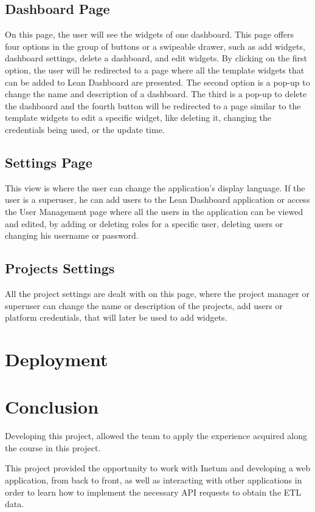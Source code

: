 \documentclass[a4paper,twoside,10pt]{report}
\begin{document}
\section{Dashboard Page}
On this page, the user will see the widgets of one dashboard. This page offers four options in the group of buttons or a swipeable drawer, such as add widgets,  dashboard settings, delete a dashboard, and edit widgets.
By clicking on the first option, the user will be redirected to a page where all the template widgets that can be added to Lean Dashboard are presented.
The second option is a pop-up to change the name and description of a dashboard.
The third is a pop-up to delete the dashboard and the fourth button will be redirected to a page similar to the template widgets to edit a specific widget, like deleting it, changing the credentials being used, or the update time.

\section{Settings Page}
This view is where the user can change the application's display language. If the user is a superuser, he can add users to the Lean Dashboard application or access the User Management page where all the users in the application can be viewed and edited, by adding or deleting roles for a specific user, deleting users or changing his username or password. 

\section{Projects Settings}
All the project settings are dealt with on this page, where the project manager or superuser can change the name or description of the projects, add users or platform credentials, that will  later be used to add widgets.
\chapter{Deployment}

\chapter{Conclusion}

Developing this project, allowed the team to apply the experience acquired along the course in this project.

This project provided the opportunity to work with Inetum and developing a web application, from back to front, as well as interacting with other applications in order
to learn how to implement the necessary API requests to obtain the ETL data.
\end{document}
